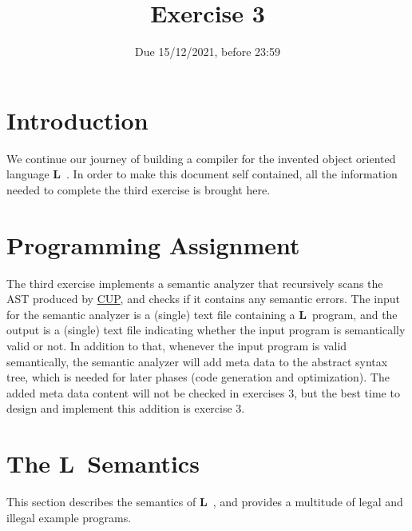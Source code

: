 \documentclass{article}
\begin{document}
\title{Exercise 3}


\date{Due 15/12/2021, before 23:59}

\maketitle

\newcommand{\plname}{\textbf{L}\ }

\section{Introduction}
We continue our journey of building a compiler
for the invented object oriented language \plname.
In order to make this document self contained,
all the information needed to complete the third exercise is brought here.

\section{Programming Assignment}
The third exercise implements a semantic analyzer that
recursively scans the AST produced by
\href{http://www2.cs.tum.edu/projects/cup/}{CUP},
and checks if it contains any semantic errors.
The input for the semantic analyzer is a (single) text file containing a \plname program,
and the output is a (single) text file indicating whether the input program
is semantically valid or not.
In addition to that, whenever the input program is valid semantically,
the semantic analyzer will add meta data to the abstract syntax tree,
which is needed for later phases (code generation and optimization).
The added meta data content will not be checked in exercises $3$,
but the best time to design and implement this addition is
exercise $3$.

\section{The \plname Semantics}
This section describes the semantics of \plname,
and provides a multitude of legal and illegal example programs.
\end{document}
